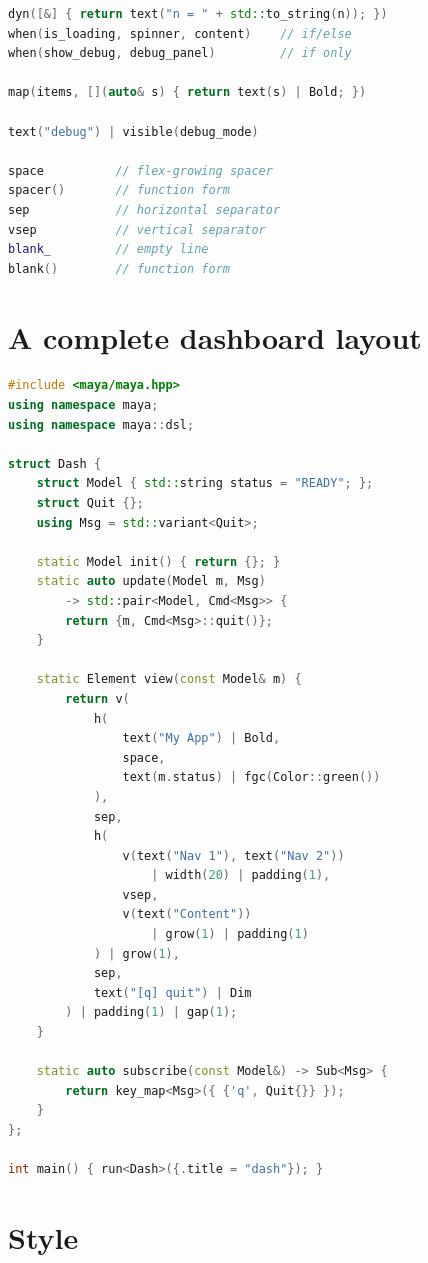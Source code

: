 \begin{lstlisting}[language=C++]
dyn([&] { return text("n = " + std::to_string(n)); })
when(is_loading, spinner, content)    // if/else
when(show_debug, debug_panel)         // if only

map(items, [](auto& s) { return text(s) | Bold; })

text("debug") | visible(debug_mode)

space          // flex-growing spacer
spacer()       // function form
sep            // horizontal separator
vsep           // vertical separator
blank_         // empty line
blank()        // function form
\end{lstlisting}

\section{A complete dashboard layout}

\begin{lstlisting}[language=C++]
#include <maya/maya.hpp>
using namespace maya;
using namespace maya::dsl;

struct Dash {
    struct Model { std::string status = "READY"; };
    struct Quit {};
    using Msg = std::variant<Quit>;

    static Model init() { return {}; }
    static auto update(Model m, Msg)
        -> std::pair<Model, Cmd<Msg>> {
        return {m, Cmd<Msg>::quit()};
    }

    static Element view(const Model& m) {
        return v(
            h(
                text("My App") | Bold,
                space,
                text(m.status) | fgc(Color::green())
            ),
            sep,
            h(
                v(text("Nav 1"), text("Nav 2"))
                    | width(20) | padding(1),
                vsep,
                v(text("Content"))
                    | grow(1) | padding(1)
            ) | grow(1),
            sep,
            text("[q] quit") | Dim
        ) | padding(1) | gap(1);
    }

    static auto subscribe(const Model&) -> Sub<Msg> {
        return key_map<Msg>({ {'q', Quit{}} });
    }
};

int main() { run<Dash>({.title = "dash"}); }
\end{lstlisting}

\section{Style}

